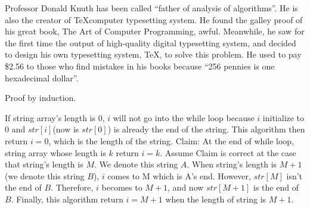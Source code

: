 \documentclass[11pt]{homework}
\begin{document}
\maketitle


\renewcommand{\writtensection}[0]{1}
\question

  \begin{arabicpartsdsa}
    \item 

        Professor Donald Knuth has been called ``father of analysis of
        algorithms''. He is also the creator of \TeX\;computer typesetting system.
        He found the galley proof of his great book, The Art of Computer
        Programming, awful. Meanwhile, he saw for the first time the output of
        high-quality digital typesetting system, and decided to design his own
        typesetting system, TeX, to solve this problem. He used to pay \$2.56 to
        those who find mistakes in his books because ``256 pennies is one
        hexadecimal dollar''.

    \item 

        Proof by induction.
        \begin{induction}
            \basecase
            If string array's length is \(0\), \(i\) will not go into the while loop
            because \(i\) initialize to \(0\) and \(str[i]\)(now is \(str[0]\)) is already
            the end of the string. This algorithm then return \(i = 0\), which is the
            length of the string.
            \indhyp
            Claim: At the end of while loop, string array whose length is \(k\) return \(i = k\).
            \indstep
            Assume Claim is correct at the case that string's length is \(M\). We
            denote this string \(A\). When string's length is \(M + 1\) (we denote this
            string \(B\)), \(i\) comes to M which is A's end. However, \(str[M]\)
            isn't the end of \(B\). Therefore, \(i\) becomes to \(M + 1\), and now
            \(str[M + 1]\) is the end of \(B\). Finally, this algorithm return
            \(i = M + 1\) when the length of string is \(M + 1\).
        \end{induction}

  \end{arabicpartsdsa}

\question
\end{document}
